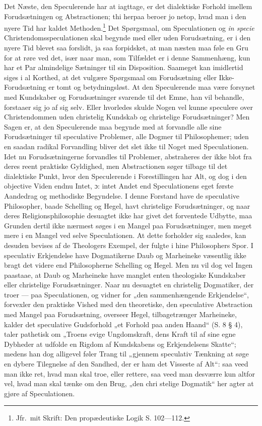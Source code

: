 Det Næste, den Speculerende har at iagttage, er det dialektiske
Forhold imellem Forudsætningen og Abstractionen; thi herpaa beroer
jo netop, hvad man i
 den nyere Tid har kaldet Methoden.\footnote{Jfr.\ mit Skrift: Den
propædeutiske Logik S. 102---112.} Det Spørgsmaal, om
Speculationen og \textit{in specie} Christendomsspeculationen skal
begynde med eller uden Forudsætning, er i den nyere Tid blevet saa
forslidt, ja saa forpidsket, at man næsten maa føle en Gru for at
røre ved det, især naar man, som Tilfældet er i denne Sammenhæng,
kun har et Par almindelige Sætninger til sin Disposition. Saameget
kan imidlertid siges i al Korthed, at det vulgære Spørgsmaal om
Forudsætning eller Ikke-Forudsætning er tomt og betydningsløst. At
den Speculerende maa være forsynet med Kundskaber og
Forudsætninger svarende til det Emne, han vil behandle, forstaaer
sig jo af sig selv. Eller hvorledes skulde Nogen vel kunne
speculere over Christendommen uden christelig Kundskab og
christelige Forudsætninger? Men Sagen er, at den Speculerende maa
begynde med at forvandle alle sine Forudsætninger til speculative
Problemer, alle Dogmer til Philosophemer; uden en saadan radikal
Forvandling bliver det slet ikke til Noget med Speculationen. Idet
nu Forudsætningerne forvandles til Problemer, abstraheres der ikke
blot fra deres reent praktiske Gyldighed, men Abstractionen søger
tilbage til det dialektiske Punkt, hvor den Speculerende i
Forestillingen har Alt, og dog i den objective Viden endnu Intet,
ɔ: intet Andet end Speculationens eget første Aandedrag og
methodiske Begyndelse. I denne
 Forstand have de speculative Philosopher, baade Schelling og
Hegel, havt christelige Forudsætninger, og naar deres
Religionsphilosophie desuagtet ikke har givet det forventede
Udbytte, maa Grunden dertil ikke nærmest søges i en Mangel paa
Forudsætninger, men meget mere i en Mangel ved selve
Speculationen. At dette forholder sig saaledes, kan desuden
bevises af de Theologers Exempel, der fulgte i hine Philosophers
Spor. I speculativ Erkjendelse have Dogmatikerne Daub og
Marheineke væsentlig ikke bragt det videre end Philosopherne
Schelling og Hegel. Men nu vil dog vel Ingen paastaae, at Daub og
Marheineke have manglet enten theologiske Kundskaber eller
christelige Forudsætninger. Naar nu desuagtet en christelig
Dogmatiker, der troer --- paa Speculationen, og vidner for „den
sammenhængende Erkjendelse“, forvexler
{} den praktiske Vished med den theoretiske, den speculative
Abstraction med Mangel paa Forudsætning, overseer Hegel,
tilbagetrænger Marheineke, kalder det speculative Gudsforhold „et
Forhold paa anden Haand“ (S. 8 § 4), taler pathetisk om „Troens
evige Ungdomskraft, dens Kraft til af sine egne Dybheder at
udfolde en Rigdom af Kundskabens og Erkjendelsens Skatte“; medens
han dog alligevel føler Trang til „gjennem speculativ Tænkning at
søge en dybere Tilegnelse af den Sandhed, der er ham det Visseste
af Alt“: saa veed man ikke ret, hvad man skal troe, eller rettere,
saa veed man desværre kun altfor vel, hvad man skal tænke om den
Brug, „den chri%
stelige Dogmatik“ her agter at gjøre af Speculationen.

